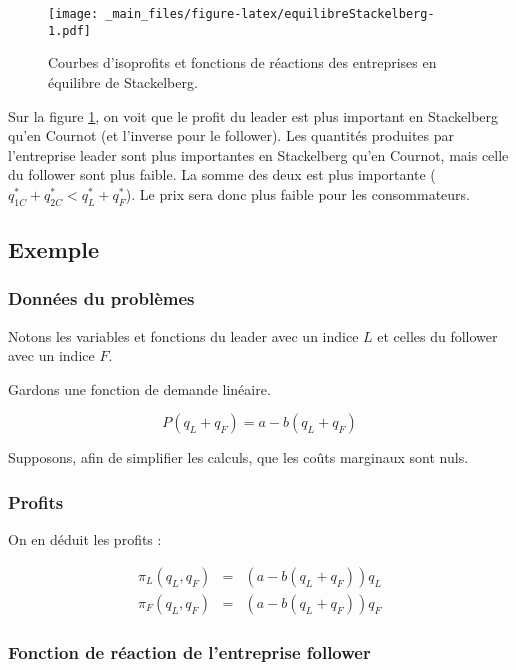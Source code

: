 \documentclass[
]{book}
\theoremstyle{definition}
\theoremstyle{definition}
\theoremstyle{definition}
\theoremstyle{definition}
\theoremstyle{remark}
\begin{document}
\begin{figure}
\centering
\texttt{[image: \_main\_files/figure-latex/equilibreStackelberg-1.pdf]}
\caption{\label{fig:equilibreStackelberg}Courbes d'isoprofits et fonctions de réactions des entreprises en équilibre de Stackelberg.}
\end{figure}

Sur la figure \ref{fig:equilibreStackelberg}, on voit que le profit du leader est plus important en Stackelberg qu'en Cournot (et l'inverse pour le follower).
Les quantités produites par l'entreprise leader sont plus importantes en Stackelberg qu'en Cournot, mais celle du follower sont plus faible.
La somme des deux est plus importante (\(q_{1C}^*+q_{2C}^*<q_{L}^*+q_{F}^*\)).
Le prix sera donc plus faible pour les consommateurs.

\hypertarget{exemple-1}{%
\subsection{Exemple}\label{exemple-1}}

\hypertarget{donnuxe9es-du-probluxe8mes}{%
\subsubsection{Données du problèmes}\label{donnuxe9es-du-probluxe8mes}}

Notons les variables et fonctions du leader avec un indice \(L\) et celles du follower avec un indice \(F\).

Gardons une fonction de demande linéaire.

\[
P(q_L+q_F) = a - b(q_L+q_F)
\]

Supposons, afin de simplifier les calculs, que les coûts marginaux sont nuls.

\hypertarget{profits-1}{%
\subsubsection{Profits}\label{profits-1}}

On en déduit les profits :

\[
\begin{array}{rcl}
\pi_L(q_L, q_F) &=& \left(a-b(q_L+q_F)\right)q_L\\
\pi_F(q_L, q_F) &=& \left(a-b(q_L+q_F)\right)q_F
\end{array}
\]

\hypertarget{fonction-de-ruxe9action-de-lentreprise-follower}{%
\subsubsection{Fonction de réaction de l'entreprise follower}\label{fonction-de-ruxe9action-de-lentreprise-follower}}
\end{document}
